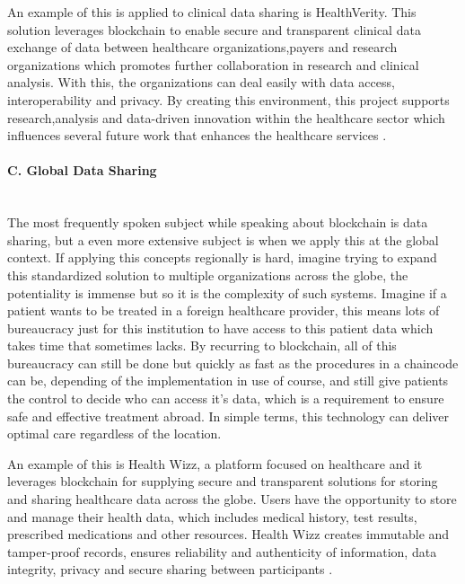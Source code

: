 An example of this is applied to clinical data sharing is HealthVerity. This solution leverages blockchain to enable secure and transparent 
clinical data exchange of data between healthcare organizations,payers and research organizations which promotes further collaboration in 
research and clinical analysis. With this, the organizations can deal easily with data access, interoperability and privacy. By creating 
this environment, this project supports research,analysis and data-driven innovation within the healthcare sector which influences 
several future work that enhances the healthcare services \cite{block-apps-increased-transparency} \cite{health-verity}.

\paragraph{C. Global Data Sharing} \mbox{}\\
The most frequently spoken subject while speaking about blockchain is data sharing, but a even more extensive 
subject is when we apply this at the global context. If applying this concepts regionally is hard, imagine trying to expand 
this standardized solution to multiple organizations across the globe, the potentiality is immense but so it is the complexity 
of such systems. Imagine if a patient wants to be treated in a foreign healthcare provider, this means lots of bureaucracy just 
for this institution to have access to this patient data which takes time that sometimes lacks. By recurring to blockchain, all 
of this bureaucracy can still be done but quickly as fast as the procedures in a chaincode can be, depending of the implementation 
in use of course, and still give patients the control to decide who can access it's data, which is a requirement to ensure safe and 
effective treatment abroad. In simple terms, this technology can deliver optimal care regardless of the location.

An example of this is Health Wizz, a platform focused on healthcare and it leverages blockchain for supplying secure and transparent 
solutions for storing and sharing healthcare data across the globe. Users have the opportunity to store and manage their health data, which 
includes medical history, test results, prescribed medications and other resources. Health Wizz creates immutable and tamper-proof records,
ensures reliability and authenticity of information, data integrity, privacy and secure sharing between participants \cite{health-wizz} 
\cite{blockchain-pharmaceutical-cold-chain}. 

